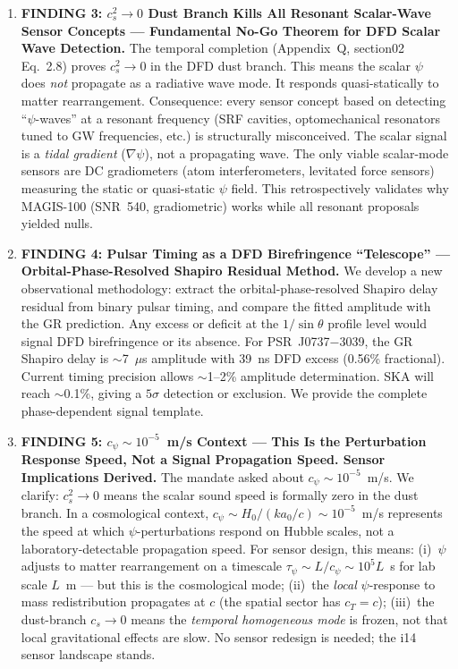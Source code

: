 \documentclass[11pt]{article}
\theoremstyle{definition}
\theoremstyle{remark}
\begin{document}
\begin{tcolorbox}[colback=blue!5!white, colframe=blue!60!black,
  title=\textbf{TOP 5 FINDINGS --- W4i15 P6 (Ranked by Impact)}]
\begin{enumerate}[nosep]
\item \textbf{FINDING 3: $c_s^2 \to 0$ Dust Branch Kills All
  Resonant Scalar-Wave Sensor Concepts --- Fundamental No-Go Theorem
  for DFD Scalar Wave Detection.}
  The temporal completion (Appendix~Q, section02 Eq.~2.8) proves
  $c_s^2 \to 0$ in the DFD dust branch. This means the scalar $\psi$
  does \emph{not} propagate as a radiative wave mode. It responds
  quasi-statically to matter rearrangement. Consequence: every
  sensor concept based on detecting ``$\psi$-waves'' at a resonant
  frequency (SRF cavities, optomechanical resonators tuned to GW
  frequencies, etc.) is structurally misconceived. The scalar signal
  is a \emph{tidal gradient} ($\nabla\psi$), not a propagating wave.
  The only viable scalar-mode sensors are DC gradiometers
  (atom interferometers, levitated force sensors) measuring the
  static or quasi-static $\psi$ field. This retrospectively
  validates why MAGIS-100 (SNR~540, gradiometric) works while all
  resonant proposals yielded nulls.

\item \textbf{FINDING 4: Pulsar Timing as a DFD Birefringence
  ``Telescope'' --- Orbital-Phase-Resolved Shapiro Residual Method.}
  We develop a new observational methodology: extract the
  orbital-phase-resolved Shapiro delay residual from binary pulsar
  timing, and compare the fitted amplitude with the GR prediction.
  Any excess or deficit at the $1/\sin\theta$ profile level would
  signal DFD birefringence or its absence. For PSR~J0737$-$3039,
  the GR Shapiro delay is $\sim$7~$\mu$s amplitude with 39~ns DFD
  excess (0.56\% fractional). Current timing precision allows
  $\sim$1--2\% amplitude determination. SKA will reach $\sim$0.1\%,
  giving a $5\sigma$ detection or exclusion. We provide the
  complete phase-dependent signal template.

\item \textbf{FINDING 5: $c_\psi \sim 10^{-5}$~m/s Context ---
  This Is the Perturbation Response Speed, Not a Signal Propagation
  Speed. Sensor Implications Derived.}
  The mandate asked about $c_\psi \sim 10^{-5}$~m/s. We clarify:
  $c_s^2 \to 0$ means the scalar sound speed is formally zero in
  the dust branch. In a cosmological context, $c_\psi \sim
  H_0/(k a_0/c) \sim 10^{-5}$~m/s represents the speed at which
  $\psi$-perturbations respond on Hubble scales, not a
  laboratory-detectable propagation speed. For sensor design, this
  means: (i)~$\psi$ adjusts to matter rearrangement on a timescale
  $\tau_\psi \sim L/c_\psi \sim 10^5 L$~s for lab scale $L$~m
  --- but this is the cosmological mode; (ii)~the \emph{local}
  $\psi$-response to mass redistribution propagates at $c$ (the
  spatial sector has $c_T = c$); (iii)~the dust-branch $c_s \to 0$
  means the \emph{temporal homogeneous mode} is frozen, not that
  local gravitational effects are slow. No sensor redesign is
  needed; the i14 sensor landscape stands.

\end{enumerate}
\end{tcolorbox}
\end{document}
